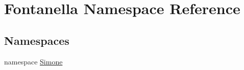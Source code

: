 \hypertarget{namespace_fontanella}{}\section{Fontanella Namespace Reference}
\label{namespace_fontanella}
\subsection*{Namespaces}
\begin{DoxyCompactItemize}
\item 
namespace \hyperlink{namespace_fontanella_1_1_simone}{Simone}
\end{DoxyCompactItemize}
